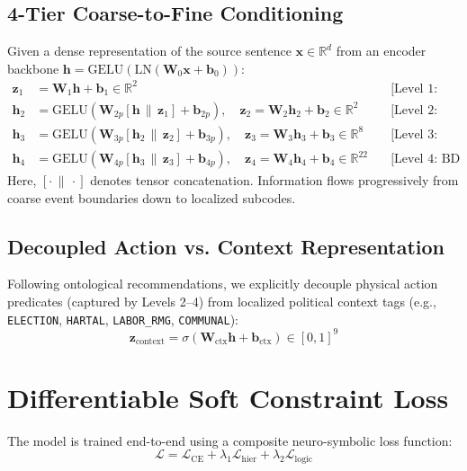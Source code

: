 \documentclass[11pt,a4paper]{article}
\begin{document}
\subsection{4-Tier Coarse-to-Fine Conditioning}
Given a dense representation of the source sentence $\mathbf{x} \in \mathbb{R}^d$ from an encoder backbone $\mathbf{h} = \text{GELU}(\text{LN}(\mathbf{W}_0 \mathbf{x} + \mathbf{b}_0))$:
\begin{align}
    \mathbf{z}_1 &= \mathbf{W}_1 \mathbf{h} + \mathbf{b}_1 \in \mathbb{R}^2 \quad &\text{[Level 1: Event Identification]} \\
    \mathbf{h}_2 &= \text{GELU}(\mathbf{W}_{2p} [\mathbf{h} \,\|\, \mathbf{z}_1] + \mathbf{b}_{2p}), \quad \mathbf{z}_2 = \mathbf{W}_2 \mathbf{h}_2 + \mathbf{b}_2 \in \mathbb{R}^2 \quad &\text{[Level 2: Violence Binary]} \\
    \mathbf{h}_3 &= \text{GELU}(\mathbf{W}_{3p} [\mathbf{h}_2 \,\|\, \mathbf{z}_2] + \mathbf{b}_{3p}), \quad \mathbf{z}_3 = \mathbf{W}_3 \mathbf{h}_3 + \mathbf{b}_3 \in \mathbb{R}^8 \quad &\text{[Level 3: CAMEO Root 13--20]} \\
    \mathbf{h}_4 &= \text{GELU}(\mathbf{W}_{4p} [\mathbf{h}_3 \,\|\, \mathbf{z}_3] + \mathbf{b}_{4p}), \quad \mathbf{z}_4 = \mathbf{W}_4 \mathbf{h}_4 + \mathbf{b}_4 \in \mathbb{R}^{22} \quad &\text{[Level 4: BD Subcode]}
\end{align}
Here, $[\cdot \,\|\, \cdot]$ denotes tensor concatenation. Information flows progressively from coarse event boundaries down to localized subcodes.

\subsection{Decoupled Action vs. Context Representation}
Following ontological recommendations, we explicitly decouple physical action predicates (captured by Levels 2--4) from localized political context tags (e.g., \texttt{ELECTION}, \texttt{HARTAL}, \texttt{LABOR\_RMG}, \texttt{COMMUNAL}):
\begin{equation}
    \mathbf{z}_{\text{context}} = \sigma(\mathbf{W}_{\text{ctx}} \mathbf{h} + \mathbf{b}_{\text{ctx}}) \in [0, 1]^9
\end{equation}

\section{Differentiable Soft Constraint Loss}
The model is trained end-to-end using a composite neuro-symbolic loss function:
\begin{equation}
    \mathcal{L} = \mathcal{L}_{\text{CE}} + \lambda_1 \mathcal{L}_{\text{hier}} + \lambda_2 \mathcal{L}_{\text{logic}}
\end{equation}
\end{document}
